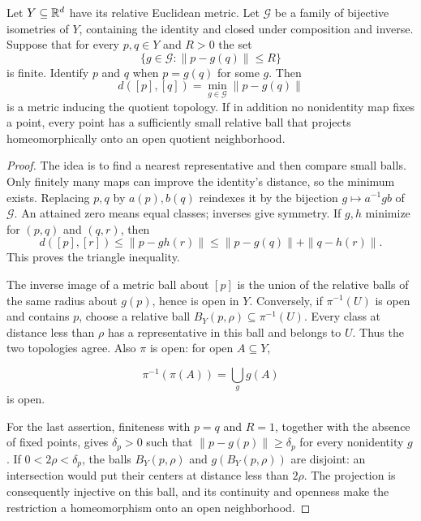 \begin{proposition}
\label{prop:isometric-quotient-metric}
Let $Y\subseteq\mathbb{R}^d$ have its relative Euclidean metric. Let $\mathcal G$
be a family of bijective isometries of $Y$, containing the identity and
closed under composition and inverse. Suppose that for every $p,q\in Y$
and $R>0$ the set
\[
\{g\in\mathcal G:\|p-g(q)\|\leq R\}
\]
is finite. Identify $p$ and $q$ when $p=g(q)$ for some $g$. Then
\[
d([p],[q])=\min_{g\in\mathcal G}\|p-g(q)\|
\]
is a metric inducing the quotient topology. If in addition no nonidentity
map fixes a point, every point has a sufficiently small relative ball
that projects homeomorphically onto an open quotient neighborhood.
\end{proposition}
\begin{proof}
The idea is to find a nearest representative and then compare small balls.
Only finitely many maps can improve the identity's distance, so the minimum
exists. Replacing $p,q$ by $a(p),b(q)$ reindexes it by the bijection
$g\mapsto a^{-1}gb$ of $\mathcal G$. An attained zero means equal classes;
inverses give symmetry. If $g,h$ minimize for $(p,q)$ and $(q,r)$, then
\[
d([p],[r])\leq\|p-gh(r)\|
\leq\|p-g(q)\|+\|q-h(r)\|.
\]
This proves the triangle inequality.

The inverse image of a metric ball about $[p]$ is the union of the relative
balls of the same radius about $g(p)$, hence is open in $Y$. Conversely,
if $\pi^{-1}(U)$ is open and contains $p$, choose a relative ball
$B_Y(p,\rho)\subseteq\pi^{-1}(U)$. Every class at distance less than
$\rho$ has a representative in this ball and belongs to $U$.
Thus the two topologies agree. Also $\pi$ is open: for open $A\subseteq Y$,

\[
\pi^{-1}(\pi(A))=\bigcup_g g(A)
\]
 is open.

For the last assertion, finiteness with $p=q$ and $R=1$, together with
the absence of fixed points, gives $\delta_p>0$ such that
$\|p-g(p)\|\geq\delta_p$ for every nonidentity $g$.
If $0<2\rho<\delta_p$, the balls $B_Y(p,\rho)$ and
$g(B_Y(p,\rho))$ are disjoint: an intersection would put their centers
at distance less than $2\rho$. The projection is consequently injective
on this ball, and its continuity and openness make the restriction a
homeomorphism onto an open neighborhood.
\end{proof}

